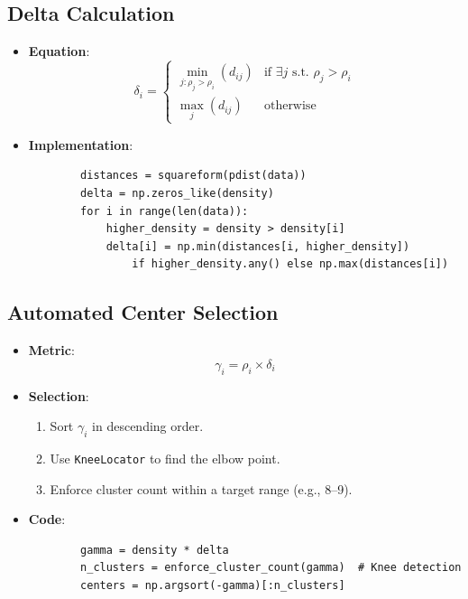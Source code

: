 \documentclass{article}
\begin{document}
\subsection{Delta Calculation}
\begin{itemize}
    \item \textbf{Equation}:
    \begin{equation}
        \delta_i = 
        \begin{cases} 
            \min_{j:\rho_j > \rho_i}(d_{ij}) & \text{if } \exists j \text{ s.t. } \rho_j > \rho_i \\
            \max_j(d_{ij}) & \text{otherwise}
        \end{cases}
    \end{equation}
    \item \textbf{Implementation}:
    \begin{verbatim}
        distances = squareform(pdist(data))
        delta = np.zeros_like(density)
        for i in range(len(data)):
            higher_density = density > density[i]
            delta[i] = np.min(distances[i, higher_density]) 
                if higher_density.any() else np.max(distances[i])
    \end{verbatim}
\end{itemize}

\subsection{Automated Center Selection}
\begin{itemize}
    \item \textbf{Metric}:
    \begin{equation}
        \gamma_i = \rho_i \times \delta_i
    \end{equation}
    \item \textbf{Selection}:
    \begin{enumerate}
        \item Sort \(\gamma_i\) in descending order.
        \item Use \texttt{KneeLocator} to find the elbow point.
        \item Enforce cluster count within a target range (e.g., 8–9).
    \end{enumerate}
    \item \textbf{Code}:
    \begin{verbatim}
        gamma = density * delta
        n_clusters = enforce_cluster_count(gamma)  # Knee detection
        centers = np.argsort(-gamma)[:n_clusters]
    \end{verbatim}
\end{itemize}
\end{document}
